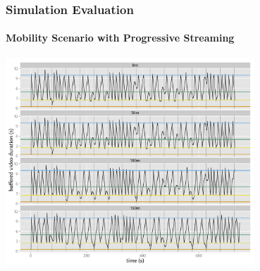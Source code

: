 \documentclass{beamer}
\begin{document}
\begin{frame}
	\frametitle{Simulation Evaluation}
	\framesubtitle{Mobility Scenario with Progressive Streaming}

	\begin{center}
	\includegraphics[width=0.7\textwidth]{extras/R-ltesim-plotbuffer-mobility-facets.png}
	\end{center}







\end{frame}
\end{document}
